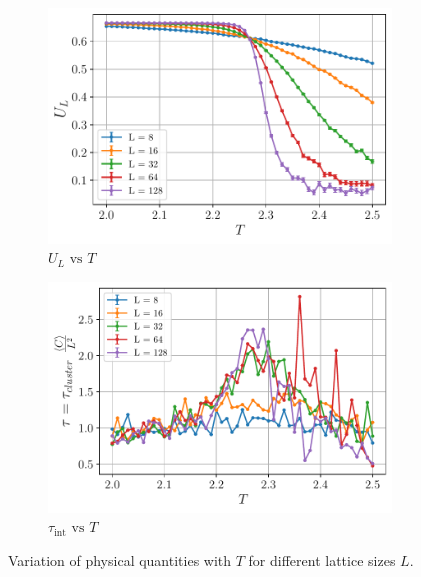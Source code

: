 \documentclass[../journal_main.tex]{subfiles}
\begin{document}
\begin{figure}[!htb]\ContinuedFloat
    \centering
    \begin{subfigure}[b]{0.49\textwidth}
        \centering
        \includegraphics[width=\textwidth]{images/monte_carlo/wolff_cluster/U_L.pdf}
        \caption{$U_L \text{ vs } T$}
        \label{bindercumulant}
    \end{subfigure}
    \begin{subfigure}[b]{0.49\textwidth}
        \centering
        \includegraphics[width=\textwidth]{images/monte_carlo/wolff_cluster/autocorr times.pdf}
        \caption{$\tau_\text{int} \text{ vs } T$}
        \label{autocorrelationtime}
    \end{subfigure}
    \caption{Variation of physical quantities with $T$ for different lattice sizes $L$.}
    \label{expvalvsT}
\end{figure}
\end{document}
